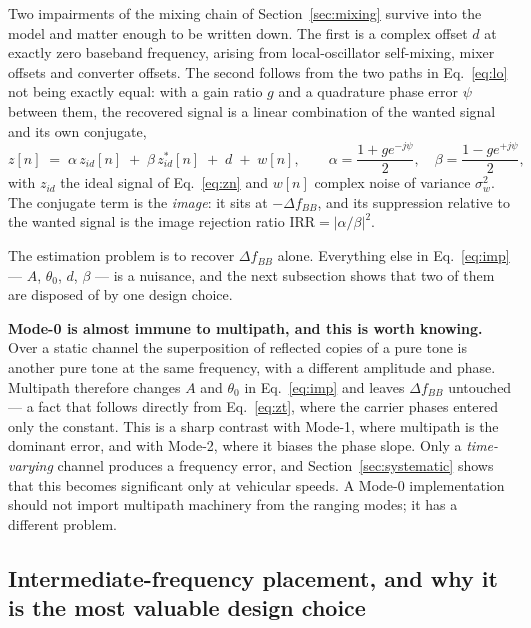 \documentclass[11pt,a4paper]{article}
\begin{document}
Two impairments of the mixing chain of Section~\ref{sec:mixing} survive into the model and matter
enough to be written down. The first is a complex offset $d$ at exactly zero baseband frequency,
arising from local-oscillator self-mixing, mixer offsets and converter offsets. The second follows
from the two paths in Eq.~\eqref{eq:lo} not being exactly equal: with a gain ratio $g$ and a
quadrature phase error $\psi$ between them, the recovered signal is a linear combination of the
wanted signal and its own conjugate,
\begin{equation}
z[n] \;=\; \alpha\, z_{id}[n] \;+\; \beta\, z_{id}^{*}[n] \;+\; d \;+\; w[n],
\qquad
\alpha = \frac{1+g e^{-j\psi}}{2},
\quad
\beta  = \frac{1-g e^{+j\psi}}{2},
\label{eq:imp}
\end{equation}
with $z_{id}$ the ideal signal of Eq.~\eqref{eq:zn} and $w[n]$ complex noise of variance
$\sigma_w^2$. The conjugate term is the \emph{image}: it sits at $-\Delta f_{BB}$, and its
suppression relative to the wanted signal is the image rejection ratio
$\mathrm{IRR} = |\alpha/\beta|^2$.

The estimation problem is to recover $\Delta f_{BB}$ alone. Everything else in Eq.~\eqref{eq:imp} ---
$A$, $\theta_0$, $d$, $\beta$ --- is a nuisance, and the next subsection shows that two of them are
disposed of by one design choice.

\begin{callout}
\textbf{Mode-0 is almost immune to multipath, and this is worth knowing.} Over a static channel the
superposition of reflected copies of a pure tone is another pure tone at the same frequency, with a
different amplitude and phase. Multipath therefore changes $A$ and $\theta_0$ in
Eq.~\eqref{eq:imp} and leaves $\Delta f_{BB}$ untouched --- a fact that follows directly from
Eq.~\eqref{eq:zt}, where the carrier phases entered only the constant. This is a sharp contrast with
Mode-1, where multipath is the dominant error, and with Mode-2, where it biases the phase slope. Only
a \emph{time-varying} channel produces a frequency error, and Section~\ref{sec:systematic} shows that
this becomes significant only at vehicular speeds. A Mode-0 implementation should not import
multipath machinery from the ranging modes; it has a different problem.
\end{callout}

\subsection{Intermediate-frequency placement, and why it is the most valuable design choice}
\label{sec:ifplace}
\end{document}
